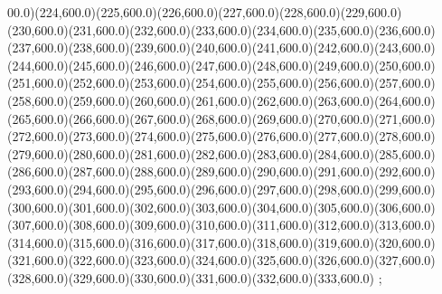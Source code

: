 {00.0)(224,600.0)(225,600.0)(226,600.0)(227,600.0)(228,600.0)(229,600.0)(230,600.0)(231,600.0)(232,600.0)(233,600.0)(234,600.0)(235,600.0)(236,600.0)(237,600.0)(238,600.0)(239,600.0)(240,600.0)(241,600.0)(242,600.0)(243,600.0)(244,600.0)(245,600.0)(246,600.0)(247,600.0)(248,600.0)(249,600.0)(250,600.0)(251,600.0)(252,600.0)(253,600.0)(254,600.0)(255,600.0)(256,600.0)(257,600.0)(258,600.0)(259,600.0)(260,600.0)(261,600.0)(262,600.0)(263,600.0)(264,600.0)(265,600.0)(266,600.0)(267,600.0)(268,600.0)(269,600.0)(270,600.0)(271,600.0)(272,600.0)(273,600.0)(274,600.0)(275,600.0)(276,600.0)(277,600.0)(278,600.0)(279,600.0)(280,600.0)(281,600.0)(282,600.0)(283,600.0)(284,600.0)(285,600.0)(286,600.0)(287,600.0)(288,600.0)(289,600.0)(290,600.0)(291,600.0)(292,600.0)(293,600.0)(294,600.0)(295,600.0)(296,600.0)(297,600.0)(298,600.0)(299,600.0)(300,600.0)(301,600.0)(302,600.0)(303,600.0)(304,600.0)(305,600.0)(306,600.0)(307,600.0)(308,600.0)(309,600.0)(310,600.0)(311,600.0)(312,600.0)(313,600.0)(314,600.0)(315,600.0)(316,600.0)(317,600.0)(318,600.0)(319,600.0)(320,600.0)(321,600.0)(322,600.0)(323,600.0)(324,600.0)(325,600.0)(326,600.0)(327,600.0)(328,600.0)(329,600.0)(330,600.0)(331,600.0)(332,600.0)(333,600.0)
    };
